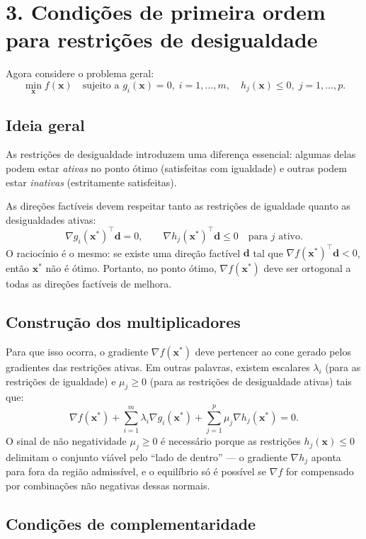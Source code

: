\documentclass[9pt,a4paper]{extarticle}
\begin{document}
\vspace{1em}

\section*{3. Condições de primeira ordem para restrições de desigualdade}

Agora considere o problema geral:
\[
\min_{\bm{x}} f(\bm{x}) 
\quad \text{sujeito a } 
g_i(\bm{x}) = 0, \; i=1,\dots,m, \quad
h_j(\bm{x}) \le 0, \; j=1,\dots,p.
\]

\subsection*{Ideia geral}

As restrições de desigualdade introduzem uma diferença essencial: algumas delas podem estar \textit{ativas} no ponto ótimo (satisfeitas com igualdade) e outras podem estar \textit{inativas} (estritamente satisfeitas).  

As direções factíveis devem respeitar tanto as restrições de igualdade quanto as desigualdades ativas:
\[
\nabla g_i(\bm{x}^*)^\top \bm{d} = 0, 
\qquad
\nabla h_j(\bm{x}^*)^\top \bm{d} \le 0 
\quad \text{para } j \text{ ativo.}
\]
O raciocínio é o mesmo: se existe uma direção factível $\bm{d}$ tal que $\nabla f(\bm{x}^*)^\top \bm{d} < 0$, então $\bm{x}^*$ não é ótimo.  
Portanto, no ponto ótimo, $\nabla f(\bm{x}^*)$ deve ser ortogonal a todas as direções factíveis de melhora.

\subsection*{Construção dos multiplicadores}

Para que isso ocorra, o gradiente $\nabla f(\bm{x}^*)$ deve pertencer ao cone gerado pelos gradientes das restrições ativas.  
Em outras palavras, existem escalares $\lambda_i$ (para as restrições de igualdade) e $\mu_j \ge 0$ (para as restrições de desigualdade ativas) tais que:
\[
\nabla f(\bm{x}^*) + \sum_{i=1}^{m} \lambda_i \nabla g_i(\bm{x}^*) + \sum_{j=1}^{p} \mu_j \nabla h_j(\bm{x}^*) = 0.
\]
O sinal de não negatividade $\mu_j \ge 0$ é necessário porque as restrições $h_j(\bm{x}) \le 0$ delimitam o conjunto viável pelo “lado de dentro” — o gradiente $\nabla h_j$ aponta para fora da região admissível, e o equilíbrio só é possível se $\nabla f$ for compensado por combinações não negativas dessas normais.

\subsection*{Condições de complementaridade}
\end{document}
